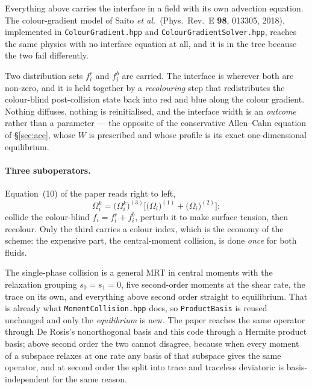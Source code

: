 \documentclass[11pt,a4paper]{article}
\newcommand{\code}[1]{\texttt{\small #1}}
\begin{document}
Everything above carries the interface in a field with its own advection
equation. The colour-gradient model of Saito \emph{et al.}\ (Phys.\ Rev.\ E
\textbf{98}, 013305, 2018), implemented in \code{ColourGradient.hpp} and
\code{ColourGradientSolver.hpp}, reaches the same physics with no interface
equation at all, and it is in the tree because the two fail differently.

Two distribution sets $f_i^r$ and $f_i^b$ are carried. The interface is wherever
both are non-zero, and it is held together by a \emph{recolouring} step that
redistributes the colour-blind post-collision state back into red and blue along
the colour gradient. Nothing diffuses, nothing is reinitialised, and the
interface width is an \emph{outcome} rather than a parameter --- the opposite of
the conservative Allen--Cahn equation of \S\ref{sec:ace}, whose $W$ is
prescribed and whose profile is its exact one-dimensional equilibrium.

\paragraph{Three suboperators.} Equation~(10) of the paper reads right to left,
\begin{equation}
  \Omega_i^k = \big(\Omega_i^k\big)^{(3)}
               \Big[\big(\Omega_i\big)^{(1)} + \big(\Omega_i\big)^{(2)}\Big] :
\end{equation}
collide the colour-blind $f_i = f_i^r + f_i^b$, perturb it to make surface
tension, then recolour. Only the third carries a colour index, which is the
economy of the scheme: the expensive part, the central-moment collision, is done
\emph{once} for both fluids.

The single-phase collision is a general MRT in central moments with the
relaxation grouping $s_0 = s_1 = 0$, five second-order moments at the shear
rate, the trace on its own, and everything above second order straight to
equilibrium. That is already what \code{MomentCollision.hpp} does, so
\code{ProductBasis} is reused unchanged and only the \emph{equilibrium} is new.
The paper reaches the same operator through De Rosis's nonorthogonal basis and
this code through a Hermite product basis; above second order the two cannot
disagree, because when every moment of a subspace relaxes at one rate any basis
of that subspace gives the same operator, and at second order the split into
trace and traceless deviatoric is basis-independent for the same reason.
\end{document}
